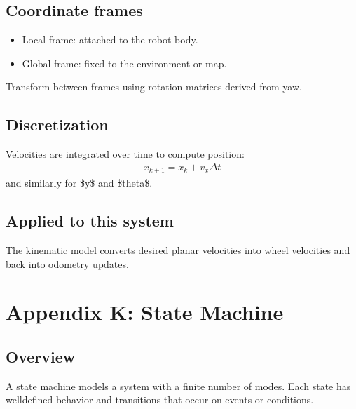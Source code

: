 \documentclass[letterpaper,10pt,english]{sphinxmanual}
\begin{document}
\section{Coordinate frames}
\label{\detokenize{appendix_j_kinematics:coordinate-frames}}\begin{itemize}
\item {} 
\sphinxAtStartPar
Local frame: attached to the robot body.

\item {} 
\sphinxAtStartPar
Global frame: fixed to the environment or map.

\end{itemize}

\sphinxAtStartPar
Transform between frames using rotation matrices derived from yaw.


\section{Discretization}
\label{\detokenize{appendix_j_kinematics:discretization}}
\sphinxAtStartPar
Velocities are integrated over time to compute position:
\begin{equation*}
\begin{split}x_{k+1} = x_k + v_x \Delta t\end{split}
\end{equation*}
\sphinxAtStartPar
and similarly for \$y\$ and \$theta\$.


\section{Applied to this system}
\label{\detokenize{appendix_j_kinematics:applied-to-this-system}}
\sphinxAtStartPar
The kinematic model converts desired planar velocities into wheel velocities
and back into odometry updates.


\chapter{Appendix K: State Machine}
\label{\detokenize{appendix_k_state_machine:appendix-k-state-machine}}\label{\detokenize{appendix_k_state_machine::doc}}

\section{Overview}
\label{\detokenize{appendix_k_state_machine:overview}}
\sphinxAtStartPar
A state machine models a system with a finite number of modes. Each state has
well\sphinxhyphen{}defined behavior and transitions that occur on events or conditions.
\end{document}
